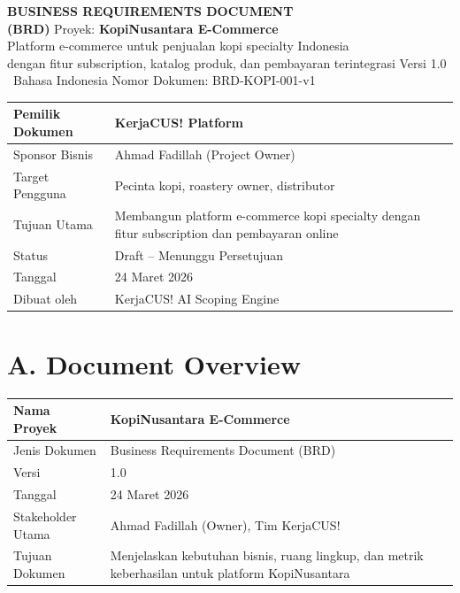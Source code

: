 \documentclass[11pt,a4paper]{article}
\begin{document}
\thispagestyle{fancy}
\begin{center}
\vspace*{3cm}
{\fontsize{15}{18}\bfseries BUSINESS REQUIREMENTS DOCUMENT\\(BRD)}
\vspace{1cm}
{\large Proyek: \textbf{KopiNusantara E-Commerce}}\\[0.3cm]
{\normalsize Platform e-commerce untuk penjualan kopi specialty Indonesia\\dengan fitur subscription, katalog produk, dan pembayaran terintegrasi}
\vspace{1cm}
{\normalsize Versi 1.0 \textbullet\ Bahasa Indonesia}
\vspace{0.5cm}
{\small Nomor Dokumen: BRD-KOPI-001-v1}
\end{center}
\vspace{2cm}
\noindent\small
\begin{tabularx}{\textwidth}{|X|X|}
\hline
\centering\textbf{Pemilik Dokumen}\arraybackslash & \centering\textbf{KerjaCUS! Platform}\arraybackslash \\\hline
Sponsor Bisnis & Ahmad Fadillah (Project Owner) \\\hline
Target Pengguna & Pecinta kopi, roastery owner, distributor \\\hline
Tujuan Utama & Membangun platform e-commerce kopi specialty dengan fitur subscription dan pembayaran online \\\hline
Status & Draft -- Menunggu Persetujuan \\\hline
Tanggal & 24 Maret 2026 \\\hline
Dibuat oleh & KerjaCUS! AI Scoping Engine \\\hline
\end{tabularx}\normalsize

\newpage

\section{A. Document Overview}
\noindent\small
\begin{tabularx}{\textwidth}{|X|X|}
\hline
\centering\textbf{Nama Proyek}\arraybackslash & \centering\textbf{KopiNusantara E-Commerce}\arraybackslash \\\hline
Jenis Dokumen & Business Requirements Document (BRD) \\\hline
Versi & 1.0 \\\hline
Tanggal & 24 Maret 2026 \\\hline
Stakeholder Utama & Ahmad Fadillah (Owner), Tim KerjaCUS! \\\hline
Tujuan Dokumen & Menjelaskan kebutuhan bisnis, ruang lingkup, dan metrik keberhasilan untuk platform KopiNusantara \\\hline
\end{tabularx}\normalsize
\end{document}
